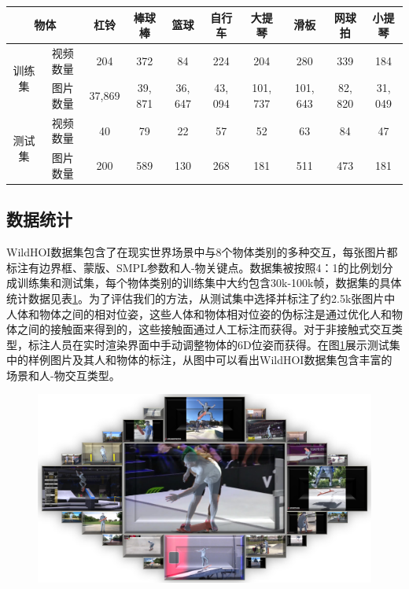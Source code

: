 \begin{table}[!htbp]
	\label{tab:dataset_statistics}
	\centering
	\footnotesize
	\setlength{\tabcolsep}{4pt}
	\renewcommand{\arraystretch}{1.2}
	\begin{tabular}{cccccccccc}
		\toprule
		\multicolumn{2}{c}{物体} & 杠铃 & 棒球棒 & 篮球 & 自行车 & 大提琴 & 滑板 & 网球拍 & 小提琴 \\
		\hline
		\multirow{2}{*}{训练集} & 视频数量 & 204 & 372 & 84 & 224 & 204 & 280 & 339 & 184\\
		\cline{2-10}
		& 图片数量 & 37,869 & 39, 871 & 36, 647 & 43, 094 & 101, 737 & 101, 643 & 82, 820 & 31, 049\\
		\hline
		\multirow{2}{*}{测试集} & 视频数量 & 40 & 79 & 22 & 57 & 52 & 63 & 84 & 47\\
		\cline{2-10}
		& 图片数量 & 200 & 589 & 130 & 268 & 181 & 511 & 473 & 181\\
		\bottomrule
	\end{tabular}
\end{table}

\subsection{数据统计}
WildHOI数据集包含了在现实世界场景中与8个物体类别的多种交互，每张图片都标注有边界框、蒙版、SMPL参数和人-物关键点。数据集被按照4：1的比例划分成训练集和测试集，每个物体类别的训练集中大约包含30k-100k帧，数据集的具体统计数据见表\ref{tab:dataset_statistics}。为了评估我们的方法，从测试集中选择并标注了约2.5k张图片中人体和物体之间的相对位姿，这些人体和物体相对位姿的伪标注是通过优化人和物体之间的接触面来得到的，这些接触面通过人工标注而获得。对于非接触式交互类型，标注人员在实时渲染界面中手动调整物体的6D位姿而获得。在图\ref{fig:hoi_annotation_vis}展示测试集中的样例图片及其人和物体的标注，从图中可以看出WildHOI数据集包含丰富的场景和人-物交互类型。

\begin{figure}[!htbp]
	\centering
	\includegraphics[width=0.8\linewidth]{Img/hoi_annotation_vis}
	\label{fig:hoi_annotation_vis}
\end{figure}

